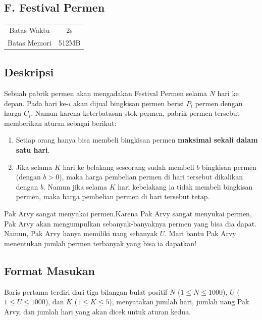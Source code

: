 \documentclass{article}
\begin{document}
\begin{center}
    \section*{F. Festival Permen} %

    \begin{tabular}{ | c c | }
        \hline
        Batas Waktu  & 2s \\    %
        Batas Memori & 512MB \\  %
        \hline
    \end{tabular}
\end{center}

\subsection*{Deskripsi}
Sebuah pabrik permen akan mengadakan Festival Permen selama $N$ hari ke depan. Pada hari ke-$i$ akan dijual bingkisan permen berisi $P_i$ permen dengan harga $C_i$. Namun karena keterbatasan stok permen, pabrik permen tersebut memberikan aturan sebagai berikut:

\begin{enumerate}
    \setlength\itemsep{0pt}
    \item Setiap orang hanya bisa membeli bingkisan permen \textbf{maksimal sekali dalam satu hari}.
    \item Jika selama $K$ hari ke belakang seseorang sudah membeli $b$ bingkisan permen (dengan $b > 0$), maka harga pembelian permen di hari tersebut dikalikan dengan $b$. Namun jika selama $K$ hari kebelakang ia tidak membeli bingkisan permen, maka harga pembelian permen di hari tersebut tetap.
\end{enumerate}

Pak Arvy sangat menyukai permen.Karena Pak Arvy sangat menyukai permen, Pak Arvy akan mengumpulkan sebanyak-banyaknya permen yang bisa dia dapat. Namun, Pak Arvy hanya memiliki uang sebanyak $U$.
Mari bantu Pak Arvy menentukan jumlah permen terbanyak yang bisa ia dapatkan!

\subsection*{Format Masukan}
Baris pertama terdiri dari tiga bilangan bulat positif $N$ ($1 \leq N \leq 1000$), $U$ ($1 \leq U \leq 1000$), dan $K$ ($1 \leq K \leq 5$), menyatakan jumlah hari, jumlah uang Pak Arvy, dan jumlah hari yang akan dicek untuk aturan kedua.
\end{document}
